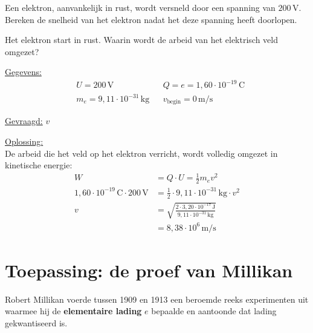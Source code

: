 \documentclass{ximera}
\begin{document}
\begin{example}[foldable=true,title={Voorbeeld: elektron versneld door een spanning}]\nl
Een elektron, aanvankelijk in rust, wordt versneld door een spanning van $200 \, \mathrm{V}$. Bereken de snelheid van het elektron nadat het deze spanning heeft doorlopen.

\begin{hint}
    Het elektron start in rust. Waarin wordt de arbeid van het elektrisch veld omgezet?
\end{hint}

\begin{solution}\nl
\underline{Gegevens:}
\begin{align*}
    & U = 200 \, \mathrm{V} & & Q = e = 1{,}60 \cdot 10^{-19} \, \mathrm{C} \\
    & m_{e} = 9{,}11 \cdot 10^{-31} \, \mathrm{kg} & & v_{\text{begin}} = 0 \, \mathrm{m/s}
\end{align*}

\underline{Gevraagd:} $v$

\underline{Oplossing:}\\
De arbeid die het veld op het elektron verricht, wordt volledig omgezet in kinetische energie:
\begin{align*}
    W &= Q \cdot U = \tfrac{1}{2} m_{e} v^{2} \\
    1{,}60 \cdot 10^{-19} \, \mathrm{C} \cdot 200 \, \mathrm{V} &= \tfrac{1}{2} \cdot 9{,}11 \cdot 10^{-31} \, \mathrm{kg} \cdot v^{2} \\
    v &= \sqrt{\frac{2 \cdot 3{,}20 \cdot 10^{-17} \, \mathrm{J}}{9{,}11 \cdot 10^{-31} \, \mathrm{kg}}} \\
    &= \boxed{8{,}38 \cdot 10^{6} \, \mathrm{m/s}}
\end{align*}
\end{solution}
\end{example}

\section{Toepassing: de proef van Millikan}
Robert Millikan voerde tussen 1909 en 1913 een beroemde reeks experimenten uit waarmee hij de \textbf{elementaire lading} $e$ bepaalde en aantoonde dat lading gekwantiseerd is.
\end{document}
